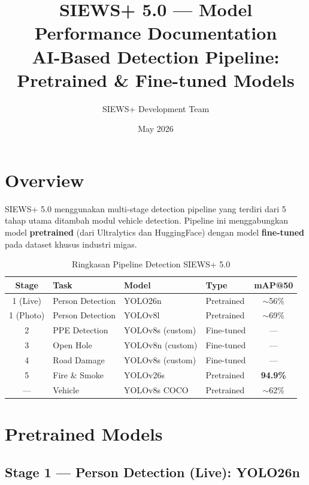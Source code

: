 \documentclass[12pt,a4paper]{article}
\title{\textbf{SIEWS+ 5.0 — Model Performance Documentation}\\[0.5em]
\large AI-Based Detection Pipeline: Pretrained \& Fine-tuned Models}
\author{SIEWS+ Development Team}
\date{May 2026}
\begin{document}
\maketitle
\tableofcontents
\newpage

\section{Overview}

SIEWS+ 5.0 menggunakan multi-stage detection pipeline yang terdiri dari 5 tahap utama ditambah modul vehicle detection. Pipeline ini menggabungkan model \textbf{pretrained} (dari Ultralytics dan HuggingFace) dengan model \textbf{fine-tuned} pada dataset khusus industri migas.

\begin{table}[H]
\centering
\caption{Ringkasan Pipeline Detection SIEWS+ 5.0}
\begin{tabular}{@{}clllc@{}}
\toprule
\textbf{Stage} & \textbf{Task} & \textbf{Model} & \textbf{Type} & \textbf{mAP@50} \\
\midrule
1 (Live) & Person Detection & YOLO26n & Pretrained & $\sim$56\% \\
1 (Photo) & Person Detection & YOLOv8l & Pretrained & $\sim$69\% \\
2 & PPE Detection & YOLOv8s (custom) & Fine-tuned & — \\
3 & Open Hole & YOLOv8n (custom) & Fine-tuned & — \\
4 & Road Damage & YOLOv8s (custom) & Fine-tuned & — \\
5 & Fire \& Smoke & YOLOv26s & Pretrained & \textbf{94.9\%} \\
— & Vehicle & YOLOv8s COCO & Pretrained & $\sim$62\% \\
\bottomrule
\end{tabular}
\end{table}

\section{Pretrained Models}

\subsection{Stage 1 — Person Detection (Live): YOLO26n}
\end{document}

